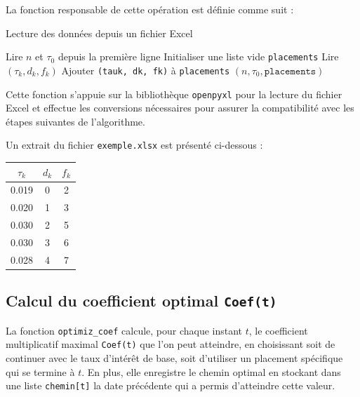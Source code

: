 \documentclass[a4paper,11pt]{article}
\begin{document}
La fonction responsable de cette opération est définie comme suit :

\begin{algorithm}[H]
\caption{Lecture des données depuis un fichier Excel}
\begin{algorithmic}[1]
    \State Lire $n$ et $\tau_0$ depuis la première ligne
    \State Initialiser une liste vide \texttt{placements}
        \State Lire $(\tau_k, d_k, f_k)$
        \State Ajouter \texttt{(tauk, dk, fk)} à \texttt{placements}
    \EndFor
    \State \Return $(n, \tau_0, \texttt{placements})$
\EndFunction
\end{algorithmic}
\end{algorithm}

Cette fonction s’appuie sur la bibliothèque \texttt{openpyxl} pour la lecture du fichier Excel et effectue les conversions nécessaires pour assurer la compatibilité avec les étapes suivantes de l’algorithme.

\vspace{0.5cm}
Un extrait du fichier \texttt{exemple.xlsx} est présenté ci-dessous :

\begin{center}
\begin{tabular}{|c|c|c|}
\hline
$\tau_k$ & $d_k$ & $f_k$ \\
\hline
0.019 & 0 & 2 \\
0.020 & 1 & 3 \\
0.030 & 2 & 5 \\
0.030 & 3 & 6 \\
0.028 & 4 & 7 \\
\hline
\end{tabular}
\label{tab:produits-exemple}
\end{center}


    \subsection{Calcul du coefficient optimal \texttt{Coef(t)}}

    La fonction \texttt{optimiz\_coef} calcule, pour chaque instant $t$, le coefficient multiplicatif maximal \texttt{Coef(t)} que l’on peut atteindre, en choisissant soit de continuer avec le taux d’intérêt de base, soit d’utiliser un placement spécifique qui se termine à $t$.  
    En plus, elle enregistre le chemin optimal en stockant dans une liste \texttt{chemin[t]} la date précédente qui a permis d’atteindre cette valeur.
\end{document}
